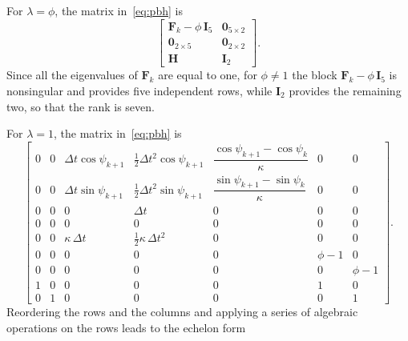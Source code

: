 For $\lambda = \phi$, the matrix in~\eqref{eq:pbh} is
\begin{equation}
    \begin{bmatrix}
        \mathbf{F}_k - \phi\,\mathbf{I}_5 & \mathbf{0}_{5\times2} \\
        \mathbf{0}_{2\times5} & \mathbf{0}_{2\times2} \\
        \mathbf{H} & \mathbf{I}_2
    \end{bmatrix}.
\end{equation}
Since all the eigenvalues of $\mathbf{F}_k$ are equal to one, for $\phi \neq 1$ the block
$\mathbf{F}_k - \phi\,\mathbf{I}_5$ is nonsingular and provides five independent rows, while
$\mathbf{I}_2$ provides the remaining two, so that the rank is seven.

\newpage
\vspace*{\fill}
\noindent For $\lambda = 1$, the matrix in~\eqref{eq:pbh} is
\begin{equation}
    \renewcommand{\arraystretch}{1.3}
    \left[
    \begin{array}{ccccc|cc}
        0 & 0 & \Delta t\cos\psi_{k+1} & \tfrac{1}{2}\Delta t^2\cos\psi_{k+1} & \dfrac{\cos\psi_{k+1} - \cos\psi_k}{\kappa} & 0 & 0 \\[1.5ex]
        0 & 0 & \Delta t\sin\psi_{k+1} & \tfrac{1}{2}\Delta t^2\sin\psi_{k+1} & \dfrac{\sin\psi_{k+1} - \sin\psi_k}{\kappa} & 0 & 0 \\[1ex]
        0 & 0 & 0 & \Delta t & 0 & 0 & 0 \\
        0 & 0 & 0 & 0 & 0 & 0 & 0 \\
        0 & 0 & \kappa\,\Delta t & \tfrac{1}{2}\kappa\,\Delta t^2 & 0 & 0 & 0 \\
        \hline
        0 & 0 & 0 & 0 & 0 & \phi - 1 & 0 \\
        0 & 0 & 0 & 0 & 0 & 0 & \phi - 1 \\
        \hline
        1 & 0 & 0 & 0 & 0 & 1 & 0 \\
        0 & 1 & 0 & 0 & 0 & 0 & 1
    \end{array}
    \right].
\end{equation}
\vspace*{\fill}
\newpage
\vspace*{\fill}
\noindent Reordering the rows and the columns and applying a series of algebraic operations on the rows
leads to the echelon form
